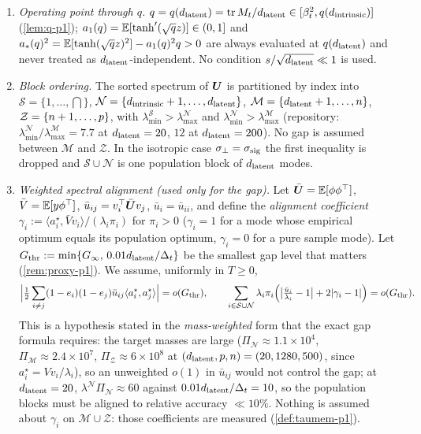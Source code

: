 \begin{assumption}
\begin{enumerate}
\item[(A4)] \emph{Operating point through $q$.} $q=q(d_{\mathrm{latent}})=\operatorname{tr}M_t/d_{\mathrm{latent}}\in[\beta_t^2,q(d_{\mathrm{intrinsic}})]$ (\cref{lem:q-p1}); $a_1(q)=\mathbb{E}[\tanh'(\sqrt qz)]\in(0,1]$ and $a_*(q)^2=\mathbb{E}[\tanh(\sqrt qz)^2]-a_1(q)^2q>0$ are always evaluated at $q(d_{\mathrm{latent}})$ and never treated as $d_{\mathrm{latent}}$-independent. No condition $s/\sqrt{d_{\mathrm{latent}}}\ll1$ is used.
\item[(A5)] \emph{Block ordering.} The sorted spectrum of $\bm{U}$ is partitioned by index into $\mathcal S=\{1,\dots,\dint\}$, $\mathcal N=\{d_{\mathrm{intrinsic}}+1,\dots,d_{\mathrm{latent}}\}$, $\mathcal M=\{d_{\mathrm{latent}}+1,\dots,n\}$, $\mathcal Z=\{n+1,\dots,p\}$, with $\lambda^{\mathcal S}_{\min}>\lambda^{\mathcal N}_{\max}$ and $\lambda^{\mathcal N}_{\min}>\lambda^{\mathcal M}_{\max}$ (repository: $\lambda^{\mathcal N}_{\min}/\lambda^{\mathcal M}_{\max}=7.7$ at $d_{\mathrm{latent}}=20$, $12$ at $d_{\mathrm{latent}}=200$). No gap is assumed between $\mathcal M$ and $\mathcal Z$. In the isotropic case $\sigma_{\perp}=\sigma_{\mathrm{sig}}$ the first inequality is dropped and $\mathcal S\cup\mathcal N$ is one population block of $d_{\mathrm{latent}}$ modes.
\item[(A6$'$)] \emph{Weighted spectral alignment (used only for the gap).} Let $\bar{\bm{U}}=\mathbb{E}[\phi\phi^{\top}]$, $\bar V=\mathbb{E}[y\phi^{\top}]$, $\bar u_{ij}=v_i^{\top}\bar{\bm{U}} v_j$, $\bar u_i=\bar u_{ii}$, and define the \emph{alignment coefficient} $\gamma_i:=\langle a_i^\star,\bar Vv_i\rangle/(\lambda_i\pi_i)$ for $\pi_i>0$ ($\gamma_i=1$ for a mode whose empirical optimum equals its population optimum, $\gamma_i=0$ for a pure sample mode). Let $G_{\rm thr}:=\min\{G_\infty,\,0.01d_{\mathrm{latent}}/\Delta_t\}$ be the smallest gap level that matters (\cref{rem:proxy-p1}). We assume, uniformly in $T\ge0$,
\[
\Big|\tfrac12\sum_{i\ne j}(1-e_i)(1-e_j)\bar u_{ij}\langle a_i^\star,a_j^\star\rangle\Big|=o(G_{\rm thr}),\qquad
\sum_{i\in\mathcal S\cup\mathcal N}\lambda_i\pi_i\Big(\big|\tfrac{\bar u_i}{\lambda_i}-1\big|+2|\gamma_i-1|\Big)=o(G_{\rm thr}).
\]
This is a hypothesis stated in the \emph{mass-weighted} form that the exact gap formula requires: the target masses are large ($\Pi_{\mathcal N}\approx1.1\times10^4$, $\Pi_{\mathcal M}\approx2.4\times10^7$, $\Pi_{\mathcal Z}\approx6\times10^8$ at $(d_{\mathrm{latent}},p,n)=(20,1280,500)$, since $a_i^\star=Vv_i/\lambda_i$), so an unweighted $o(1)$ in $\bar u_{ij}$ would not control the gap; at $d_{\mathrm{latent}}=20$, $\lambda^{\mathcal N}\Pi_{\mathcal N}\approx60$ against $0.01d_{\mathrm{latent}}/\Delta_t=10$, so the population blocks must be aligned to relative accuracy $\ll10\%$. Nothing is assumed about $\gamma_i$ on $\mathcal M\cup\mathcal Z$: those coefficients are measured (\cref{def:taumem-p1}).
\end{enumerate}
\end{assumption}

